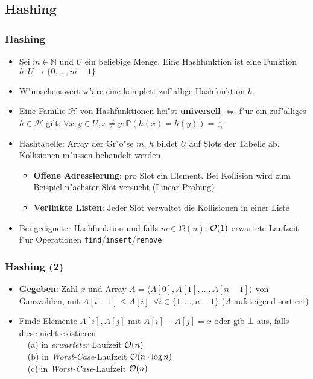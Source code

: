 \subsection{Hashing}
\begin{frame}
  \frametitle{Hashing}
  \begin{itemize}
  \item Sei $m \in \mathbb{N}$ und $U$ ein beliebige Menge.
        Eine Hashfunktion ist eine Funktion $h : U \rightarrow \{0,\ldots,m-1\}$
  \item W"unschenswert w"are eine komplett zuf"allige Hashfunktion $h$
  \item Eine Familie $\mathscr{H}$ von Hashfunktionen hei"st \textbf{universell} $\iff$
        f"ur ein zuf"alliges $h \in \mathscr{H}$ gilt:
        $\forall x, y \in U, x \neq y: \mathbb{P}(h(x) = h(y)) = \frac{1}{m}$
  \item Hashtabelle: Array der Gr"o"se $m$, $h$ bildet $U$ auf Slots der
        Tabelle ab. Kollisionen m"ussen behandelt werden
    \begin{itemize}
      \item \textbf{Offene Adressierung}: pro Slot ein Element. Bei Kollision wird zum
            Beispiel n"achster Slot versucht (Linear Probing)
      \item \textbf{Verlinkte Listen}: Jeder Slot verwaltet die Kollisionen in einer Liste
    \end{itemize}
  \item Bei geeigneter Hashfunktion und falls $m \in \Omega(n)$:
        $\mathcal{O}(1)$ erwartete Laufzeit f"ur Operationen
        \lstinline|find|/\lstinline|insert|/\lstinline|remove|
  \end{itemize}
\end{frame}

\begin{frame}
  \frametitle{Hashing (2)}
  \begin{itemize}
  \item \textbf{Gegeben}: Zahl $x$ und Array $A = \langle A[0], A[1], \ldots, A[n-1] \rangle$
        von Ganzzahlen, mit $A[i-1] \leq A[i] \ \ \forall i \in \{1,\ldots,n-1\}$ ($A$ aufsteigend sortiert)
  \item Finde Elemente $A[i], A[j]$ mit $A[i] + A[j] = x$ oder gib $\bot$ aus, falls
        diese nicht existieren \\
    \ \ (a) in \emph{erwarteter} Laufzeit $\mathcal{O}(n)$ \\
    \ \ (b) in \emph{Worst-Case}-Laufzeit $\mathcal{O}(n \cdot \log n)$ \\
    \ \ (c) in \emph{Worst-Case}-Laufzeit $\mathcal{O}(n)$
  \end{itemize}
\end{frame}

